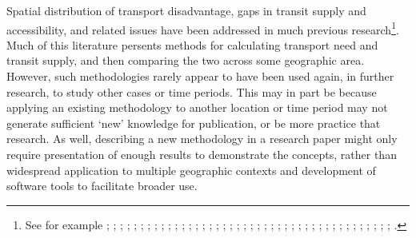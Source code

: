 \documentclass[preprint, 3p,
authoryear]{elsarticle} %
\begin{document}
Spatial distribution of transport disadvantage, gaps in transit supply
and accessibility, and related issues have been addressed in much
previous research\footnote{See for example \citet{Ricciardi2015}
  \citet{Currie2003Hobart}; \citet{currie2010identifying};
  \citet{Fransen2015Identifying}; \citet{Guzman2017Assessing};
  \citet{Jaramillo2012}; \citet{Preston2007};
  \citet{Delbosc2011Transportproblems}; \citet{Delbosc2011Thespatial};
  \citet{Engels2011Social}; \citet{Pavkova2016};
  \citet{Delbosc2011Using}; \citet{Murray2001};
  \citet{Currie2010Modeling}; \citet{Currie2007Investigating};
  \citet{Currie2007Identifying}; \citet{Yigitcanlar2007};
  \citet{Wu2003}; \citet{Currie2013Exploring};
  \citet{Preston2007Accessibility}; \citet{Hurni2005};
  \citet{Mamun2011}; \citet{El_geneidy2016}; \citet{Kaplan2014};
  \citet{Martens2012}; \citet{Lucas2016AMethod};
  \citet{Liu2012Accessibility}; \citet{Lucas2012Transport_and_social};
  \citet{Lei2010Mapping}; \citet{Mavoa2012GIS};
  \citet{Delmelle2012Evaluating}; \citet{Foth2014Toward};
  \citet{Welch2013Equity}; \citet{Bell2007Travel};
  \citet{Jaramillob2011Urban}; \citet{Guzman2017Assessing};
  \citet{Wee2011Discussing}; \citet{Currie2004Gap};
  \citet{Engels2011Social}; \citet{Litman2002Evaluation};
  \citet{Parolin2017Identifying}; \citet{Xia2016AMulti};
  \citet{Welch2013AMeasure}; \citet{Jang2017Assessing}.}. Much of this
literature persents methods for calculating transport need and transit
supply, and then comparing the two across some geographic area. However,
such methodologies rarely appear to have been used again, in further
research, to study other cases or time periods. This may in part be
because applying an existing methodology to another location or time
period may not generate sufficient `new' knowledge for publication, or
be more practice that research. As well, describing a new methodology in
a research paper might only require presentation of enough results to
demonstrate the concepts, rather than widespread application to multiple
geographic contexts and development of software tools to facilitate
broader use.
\end{document}
